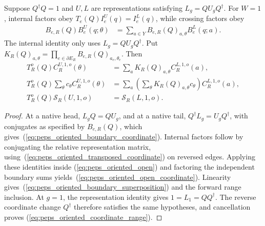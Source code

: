 \begin{lemma}%
    \label{thm:peps_oriented_coordinate_open}
    \leanok
    Suppose $Q^\dagger Q=1$ and $U,L$ are representations satisfying
    $L_g=QU_gQ^\dagger$. For $W=1$, internal factors obey
    $T_e(Q)I_e^U(q)=I_e^L(q)$, while crossing factors obey
    \begin{align}
        B_{e,R}(Q)B_e^U(q;\theta)
         & =\sum_{a\in Y}B_{e,R}(Q)_{a,\theta}B_e^L(q;a).
        \label{eq:peps_oriented_boundary_coordinate}
    \end{align}
    The internal identity only uses $L_g=QU_gQ^\dagger$.
    Put $K_R(Q)_{a,\theta}
        =\prod_{e\in\partial E_R}B_{e,R}(Q)_{a_e,\theta_e}$.
    Then
    \begin{align}
        T_R^o(Q)C_R^{U,1,o}(\theta)
                                    & =\sum_a K_R(Q)_{a,\theta}C_R^{L,1,o}(a),
        \label{eq:peps_oriented_open_coordinate}                                                \\
        T_R^o(Q)\sum_\theta c_\theta C_R^{U,1,o}(\theta)
                                    & =\sum_a\left(\sum_\theta K_R(Q)_{a,\theta}c_\theta\right)
        C_R^{L,1,o}(a),
        \label{eq:peps_oriented_boundary_superposition}                                         \\
        T_R^o(Q)\mathcal S_R(U,1,o) & =\mathcal S_R(L,1,o).
        \label{eq:peps_oriented_coordinate_range}
    \end{align}
\end{lemma}
\begin{proof}\leanok
    At a native head, $L_gQ=QU_g$, and at a native tail,
    $Q^\dagger L_g=U_gQ^\dagger$, with conjugates as specified by
    $B_{e,R}(Q)$, which gives~(\ref{eq:peps_oriented_boundary_coordinate}).
    Internal factors follow by conjugating the relative representation
    matrix, using~(\ref{eq:peps_oriented_transposed_coordinate}) on
    reversed edges. Applying these identities inside
    (\ref{eq:peps_oriented_open}) and factoring the independent boundary
    sums yields~(\ref{eq:peps_oriented_open_coordinate}).
    Linearity gives~(\ref{eq:peps_oriented_boundary_superposition}) and
    the forward range inclusion. At $g=1$, the representation identity
    gives $1=L_1=QQ^\dagger$. The reverse coordinate change $Q^\dagger$
    therefore satisfies the same hypotheses, and cancellation proves
    (\ref{eq:peps_oriented_coordinate_range}).
\end{proof}

